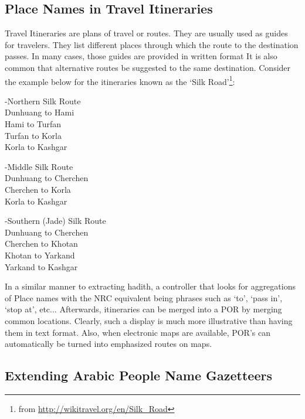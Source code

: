 \documentclass[11pt]{article}
\begin{document}
\subsection{Place Names in Travel Itineraries}

Travel Itineraries are plans of travel or routes. They are usually used as guides for travelers. They list different
places through which the route to the destination passes. 
In many cases, those guides are provided in written format
It is also common that alternative routes be suggested to the same destination.
Consider the example below for the itineraries known as the `Silk Road'\footnote{from \url{http://wikitravel.org/en/Silk_Road}}:

{\setlength{\parindent}{20pt} 
\setlength{\parskip}{1ex}
\indent-Northern Silk Route \\
\indent \indent Dunhuang to Hami \\
\indent \indent Hami to Turfan \\ 
\indent \indent Turfan to Korla \\
\indent \indent Korla to Kashgar  

\indent -Middle Silk Route \\ 
\indent \indent Dunhuang to Cherchen \\
\indent \indent Cherchen to Korla \\
\indent \indent Korla to Kashgar 

\indent -Southern (Jade) Silk Route \\
\indent \indent Dunhuang to Cherchen \\
\indent \indent Cherchen to Khotan \\
\indent \indent Khotan to Yarkand \\
\indent \indent Yarkand to Kashgar \\ }


In a similar manner to extracting hadith, a controller that looks for aggregations of Place names
with the NRC equivalent being phrases such as `to', `pass in', `stop at', etc... 
Afterwards, itineraries can be merged into a POR by merging common locations.
Clearly, such a display is much more illustrative than having them in text format.
Also, when electronic maps are available, POR's can automatically be turned into emphasized routes on maps.

\subsection{Extending Arabic People Name Gazetteers}
\end{document}
